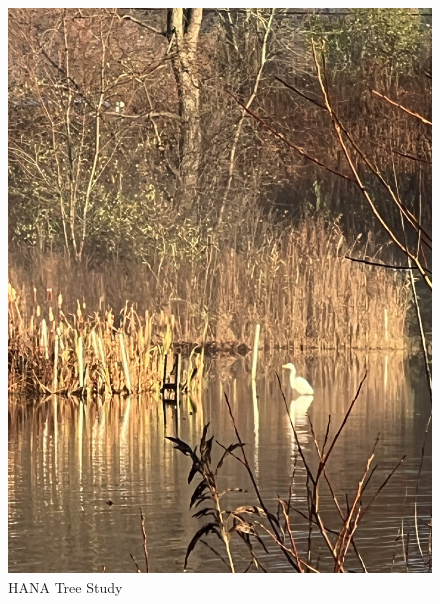 \documentclass{article}
\begin{document}
\begin{figure}[h!]
\centering
\includegraphics[scale=.1]{Research/HANA/NOV2024/IMG_9800.JPG}
\caption{HANA Tree Study}
\label{fig:HANA}
\end{figure}
\end{document}
